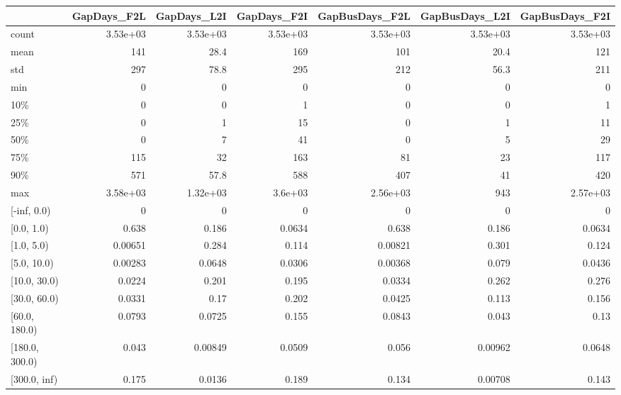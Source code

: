 \begin{tabular}{lrrrrrr}
\toprule
 & GapDays\_F2L & GapDays\_L2I & GapDays\_F2I & GapBusDays\_F2L & GapBusDays\_L2I & GapBusDays\_F2I \\
\midrule
count & 3.53e+03 & 3.53e+03 & 3.53e+03 & 3.53e+03 & 3.53e+03 & 3.53e+03 \\
mean & 141 & 28.4 & 169 & 101 & 20.4 & 121 \\
std & 297 & 78.8 & 295 & 212 & 56.3 & 211 \\
min & 0 & 0 & 0 & 0 & 0 & 0 \\
10\% & 0 & 0 & 1 & 0 & 0 & 1 \\
25\% & 0 & 1 & 15 & 0 & 1 & 11 \\
50\% & 0 & 7 & 41 & 0 & 5 & 29 \\
75\% & 115 & 32 & 163 & 81 & 23 & 117 \\
90\% & 571 & 57.8 & 588 & 407 & 41 & 420 \\
max & 3.58e+03 & 1.32e+03 & 3.6e+03 & 2.56e+03 & 943 & 2.57e+03 \\
[-inf, 0.0) & 0 & 0 & 0 & 0 & 0 & 0 \\
[0.0, 1.0) & 0.638 & 0.186 & 0.0634 & 0.638 & 0.186 & 0.0634 \\
[1.0, 5.0) & 0.00651 & 0.284 & 0.114 & 0.00821 & 0.301 & 0.124 \\
[5.0, 10.0) & 0.00283 & 0.0648 & 0.0306 & 0.00368 & 0.079 & 0.0436 \\
[10.0, 30.0) & 0.0224 & 0.201 & 0.195 & 0.0334 & 0.262 & 0.276 \\
[30.0, 60.0) & 0.0331 & 0.17 & 0.202 & 0.0425 & 0.113 & 0.156 \\
[60.0, 180.0) & 0.0793 & 0.0725 & 0.155 & 0.0843 & 0.043 & 0.13 \\
[180.0, 300.0) & 0.043 & 0.00849 & 0.0509 & 0.056 & 0.00962 & 0.0648 \\
[300.0, inf) & 0.175 & 0.0136 & 0.189 & 0.134 & 0.00708 & 0.143 \\
\bottomrule
\end{tabular}
